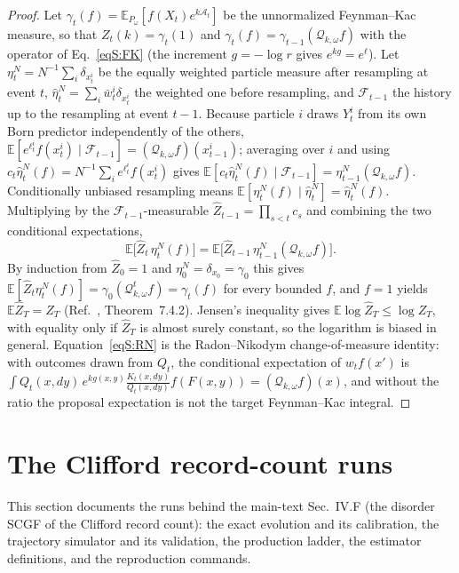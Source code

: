 \documentclass[aps,prx,reprint,superscriptaddress,nobibnotes,longbibliography]{revtex4-2}
\newcommand{\E}{\mathbb E}
\begin{document}
\begin{proof}
Let $\gamma_t(f)=\E_{P_\omega}[f(X_t)e^{k\mathcal A_t}]$ be the
unnormalized Feynman--Kac measure, so that $Z_t(k)=\gamma_t(1)$ and
$\gamma_t(f)=\gamma_{t-1}(\mathcal Q_{k,\omega}f)$ with the operator of
Eq.~\eqref{eqS:FK} (the increment $g=-\log r$ gives $e^{kg}=e^{\ell}$).
Let $\eta_t^N=N^{-1}\sum_i\delta_{x_t^i}$ be the equally weighted
particle measure after resampling at event $t$,
$\widehat\eta_t^N=\sum_i\bar w_t^i\delta_{x_t^i}$ the weighted one before
resampling, and $\mathcal F_{t-1}$ the history up to the resampling at
event $t-1$.  Because particle $i$ draws $Y_t^i$ from its own Born
predictor independently of the others,
$\E[e^{\ell_t^i}f(x_t^i)\mid\mathcal F_{t-1}]
=(\mathcal Q_{k,\omega}f)(x_{t-1}^i)$; averaging over $i$ and using
$c_t\widehat\eta_t^N(f)=N^{-1}\sum_ie^{\ell_t^i}f(x_t^i)$ gives
$\E[c_t\widehat\eta_t^N(f)\mid\mathcal F_{t-1}]
=\eta_{t-1}^N(\mathcal Q_{k,\omega}f)$.  Conditionally unbiased
resampling means
$\E[\eta_t^N(f)\mid\widehat\eta_t^N]=\widehat\eta_t^N(f)$.  Multiplying
by the $\mathcal F_{t-1}$-measurable
$\widehat Z_{t-1}=\prod_{s<t}c_s$ and combining the two conditional
expectations,
\begin{equation*}
 \E\bigl[\widehat Z_t\,\eta_t^N(f)\bigr]
 =\E\bigl[\widehat Z_{t-1}\,\eta_{t-1}^N(\mathcal Q_{k,\omega}f)\bigr].
\end{equation*}
By induction from $\widehat Z_0=1$ and
$\eta_0^N=\delta_{x_0}=\gamma_0$ this gives
$\E[\widehat Z_t\eta_t^N(f)]=\gamma_0(\mathcal Q_{k,\omega}^tf)=\gamma_t(f)$
for every bounded $f$, and $f=1$ yields $\E\widehat Z_T=Z_T$
(Ref.~\cite{DelMoral2004}, Theorem~7.4.2).  Jensen's inequality gives
$\E\log\widehat Z_T\le\log Z_T$, with equality only if $\widehat Z_T$ is
almost surely constant, so the logarithm is biased in general.
Equation~\eqref{eqS:RN} is the Radon--Nikodym change-of-measure identity:
with outcomes drawn from $Q_t$, the conditional expectation of
$w_tf(x')$ is
$\int Q_t(x,dy)\,e^{kg(x,y)}\frac{K_t(x,dy)}{Q_t(x,dy)}f(F(x,y))
=(\mathcal Q_{k,\omega}f)(x)$, and without the ratio the proposal
expectation is not the target Feynman--Kac integral.
\end{proof}

\section{The Clifford record-count runs}
\label{sm:cliffordruns}

This section documents the runs behind the main-text
Sec.~IV.F (the disorder SCGF of the Clifford record count): the exact
evolution and its calibration, the trajectory simulator and its
validation, the production ladder, the estimator definitions, and the
reproduction commands.
\end{document}
